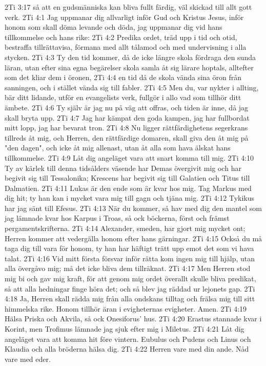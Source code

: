 2Ti 3:17  så att en gudsmänniska kan bliva fullt färdig, väl skickad till allt gott verk.
2Ti 4:1  Jag uppmanar dig allvarligt inför Gud och Kristus Jesus, inför honom som skall döma levande och döda, jag uppmanar dig vid hans tillkommelse och hans rike:
2Ti 4:2  Predika ordet, träd upp i tid och otid, bestraffa tillrättavisa, förmana med allt tålamod och med undervisning i alla stycken.
2Ti 4:3  Ty den tid kommer, då de icke längre skola fördraga den sunda läran, utan efter sina egna begärelser skola samla åt sig lärare hoptals, alltefter som det kliar dem i öronen,
2Ti 4:4  en tid då de skola vända sina öron från sanningen, och i stället vända sig till fabler.
2Ti 4:5  Men du, var nykter i allting, bär ditt lidande, utför en evangelists verk, fullgör i allo vad som tillhör ditt ämbete.
2Ti 4:6  Ty själv är jag nu på väg att offras, och tiden är inne, då jag skall bryta upp.
2Ti 4:7  Jag har kämpat den goda kampen, jag har fullbordat mitt lopp, jag har bevarat tron.
2Ti 4:8  Nu ligger rättfärdighetens segerkrans tillreds åt mig, och Herren, den rättfärdige domaren, skall giva den åt mig på "den dagen", och icke åt mig allenast, utan åt alla som hava älskat hans tillkommelse.
2Ti 4:9  Låt dig angeläget vara att snart komma till mig.
2Ti 4:10  Ty av kärlek till denna tidsålders väsende har Demas övergivit mig och har begivit sig till Tessalonika; Krescens har begivit sig till Galatien och Titus till Dalmatien.
2Ti 4:11  Lukas är den ende som är kvar hos mig. Tag Markus med dig hit; ty han kan i mycket vara mig till gagn och tjäna mig.
2Ti 4:12  Tykikus har jag sänt till Efesus.
2Ti 4:13  När du kommer, så hav med dig den mantel som jag lämnade kvar hos Karpus i Troas, så ock böckerna, först och främst pergamentskrifterna.
2Ti 4:14  Alexander, smeden, har gjort mig mycket ont; Herren kommer att vedergälla honom efter hans gärningar.
2Ti 4:15  Också du må taga dig till vara för honom, ty han har häftigt trätt upp emot det som vi hava talat.
2Ti 4:16  Vid mitt första försvar inför rätta kom ingen mig till hjälp, utan alla övergåvo mig; må det icke bliva dem tillräknat.
2Ti 4:17  Men Herren stod mig bi och gav mig kraft, för att genom mig ordet överallt skulle bliva predikat, så att alla hedningar finge höra det; och så blev jag räddad ur lejonets gap.
2Ti 4:18  Ja, Herren skall rädda mig från alla ondskans tilltag och frälsa mig till sitt himmelska rike. Honom tillhör äran i evigheternas evigheter. Amen.
2Ti 4:19  Hälsa Priska och Akvila, så ock Onesiforus' hus.
2Ti 4:20  Erastus stannade kvar i Korint, men Trofimus lämnade jag sjuk efter mig i Miletus.
2Ti 4:21  Låt dig angeläget vara att komma hit före vintern. Eubulus och Pudens och Linus och Klaudia och alla bröderna hälsa dig.
2Ti 4:22  Herren vare med din ande. Nåd vare med eder.


